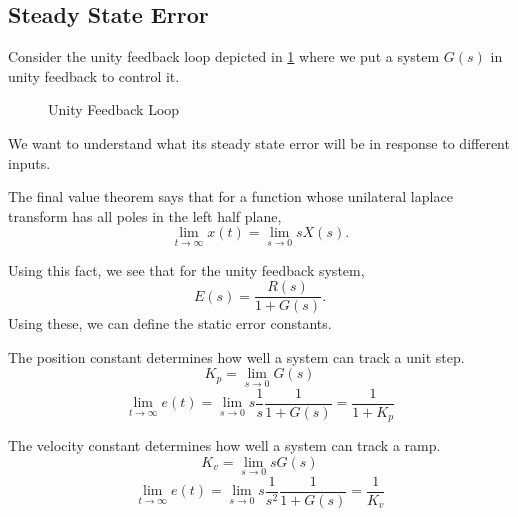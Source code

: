\subsection{Steady State Error}
Consider the unity feedback loop depicted in \cref{fig:unity-feedback-loop} where we put a system $G(s)$ in unity feedback to control it.
\begin{figure}[H]
    \centering 
    \caption{Unity Feedback Loop}
    \label{fig:unity-feedback-loop}
\end{figure}
We want to understand what its steady state error will be in response to different inputs.
\begin{theorem}
  The final value theorem says that for a function whose unilateral laplace transform has all poles in the left half plane,
  \[
	\lim_{t\to\infty}x(t) = \lim_{s\to0} sX(s).
  \]
  \label{thm:final-value-theorem}
\end{theorem}
Using this fact, we see that for the unity feedback system,
\[
  E(s) = \frac{R(s)}{1+G(s)}.
\]
Using these, we can define the static error constants.
\begin{definition}
  The position constant determines how well a system can track a unit step.
  \begin{equation}
	K_p = \lim_{s\to0}G(s)
	\label{eqn:position-constant}
  \end{equation}
  \[
	\lim_{t\to\infty} e(t) = \lim_{s\to0} s \frac{1}{s} \frac{1}{1+G(s)} = \frac{1}{1+K_p}
  \]
  \label{defn:position-constant}
\end{definition}
\begin{definition}
  The velocity constant determines how well a system can track a ramp.
  \begin{equation}
	K_v = \lim_{s\to0}sG(s)
	\label{eqn:velocity-constant}
  \end{equation}
  \[
	\lim_{t\to\infty} e(t) = \lim_{s\to0} s \frac{1}{s^2} \frac{1}{1+G(s)} = \frac{1}{K_v}
  \]
  \label{defn:velocity-constant}
\end{definition}
